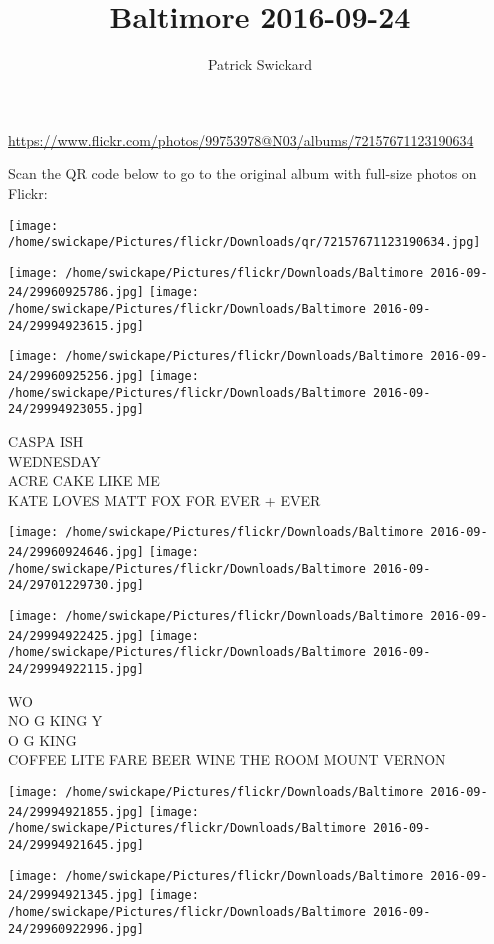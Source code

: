 \documentclass[10pt,letterpaper]{article}
\title{Baltimore 2016-09-24}
\author{Patrick Swickard}
\date{}
\begin{document}
\maketitle

\url{https://www.flickr.com/photos/99753978@N03/albums/72157671123190634}

Scan the QR code below to go to the original album with full-size photos on Flickr:

\texttt{[image: /home/swickape/Pictures/flickr/Downloads/qr/72157671123190634.jpg]}
\pagebreak

\texttt{[image: /home/swickape/Pictures/flickr/Downloads/Baltimore 2016-09-24/29960925786.jpg]}
\texttt{[image: /home/swickape/Pictures/flickr/Downloads/Baltimore 2016-09-24/29994923615.jpg]}

\texttt{[image: /home/swickape/Pictures/flickr/Downloads/Baltimore 2016-09-24/29960925256.jpg]}
\texttt{[image: /home/swickape/Pictures/flickr/Downloads/Baltimore 2016-09-24/29994923055.jpg]}

CASPA ISH\\
WEDNESDAY\\
ACRE CAKE LIKE ME\\
KATE LOVES MATT FOX FOR EVER + EVER
\pagebreak

\texttt{[image: /home/swickape/Pictures/flickr/Downloads/Baltimore 2016-09-24/29960924646.jpg]}
\texttt{[image: /home/swickape/Pictures/flickr/Downloads/Baltimore 2016-09-24/29701229730.jpg]}

\texttt{[image: /home/swickape/Pictures/flickr/Downloads/Baltimore 2016-09-24/29994922425.jpg]}
\texttt{[image: /home/swickape/Pictures/flickr/Downloads/Baltimore 2016-09-24/29994922115.jpg]}

WO\\
NO G KING Y\\
O G KING\\
COFFEE LITE FARE BEER WINE THE ROOM MOUNT VERNON
\pagebreak

\texttt{[image: /home/swickape/Pictures/flickr/Downloads/Baltimore 2016-09-24/29994921855.jpg]}
\texttt{[image: /home/swickape/Pictures/flickr/Downloads/Baltimore 2016-09-24/29994921645.jpg]}

\texttt{[image: /home/swickape/Pictures/flickr/Downloads/Baltimore 2016-09-24/29994921345.jpg]}
\texttt{[image: /home/swickape/Pictures/flickr/Downloads/Baltimore 2016-09-24/29960922996.jpg]}
\end{document}
